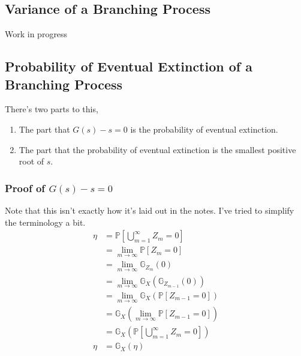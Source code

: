 \documentclass[12pt]{report}
\begin{document}
\subsection{Variance of a Branching Process}
Work in progress
\subsection{Probability of Eventual Extinction of a Branching Process}
There's two parts to this, 
\begin{enumerate}
    \item The part that $G(s) - s = 0$ is the probability of eventual
        extinction.
    \item The part that the probability of eventual extinction is the smallest
        positive root of $s$.
\end{enumerate}
\subsubsection{Proof of $G(s) - s = 0$}
Note that this isn't exactly how it's laid out in the notes. I've tried to
simplify the terminology a bit.
\begin{equation*}
    \begin{aligned}
        \eta &= \mathbb{P}\left[\bigcup_{m=1}^{\infty} Z_{m} = 0\right] \\
            &= \lim_{m\to\infty} \mathbb{P}\left[Z_{m} = 0\right] \\
            &= \lim_{m\to\infty} \mathbb{G}_{Z_{m}}(0) \\
            &= \lim_{m\to\infty} \mathbb{G}_{X}( \mathbb{G}_{Z_{m-1}}(0)) \\
            &= \lim_{m\to\infty} \mathbb{G}_{X}(\mathbb{P}\left[Z_{m-1} = 0\right]) \\
            &=  \mathbb{G}_{X}(\lim_{m\to\infty} \mathbb{P}\left[Z_{m-1} = 0\right])\\
            &=  \mathbb{G}_{X}\left(\mathbb{P}\left[\bigcup_{m=1}^{\infty}
            Z_{m} = 0\right]\right)\\
            \eta &=  \mathbb{G}_{X}(\eta)\\
    \end{aligned}
\end{equation*}
\end{document}
